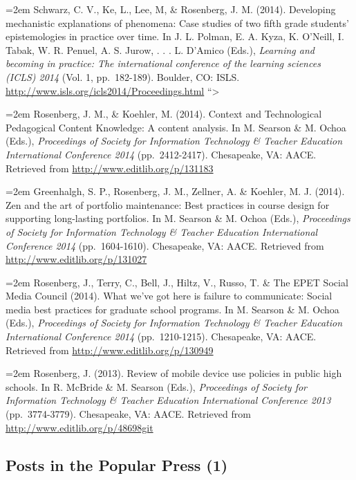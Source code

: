 \documentclass[
  14,
]{article}
\begin{document}
\hangindent=2em Schwarz, C. V., Ke, L., Lee, M, \& Rosenberg, J. M.
(2014). Developing mechanistic explanations of phenomena: Case studies
of two fifth grade students' epistemologies in practice over time. In J.
L. Polman, E. A. Kyza, K. O'Neill, I. Tabak, W. R. Penuel, A. S. Jurow,
. . . L. D'Amico (Eds.), \emph{Learning and becoming in practice: The
international conference of the learning sciences (ICLS) 2014} (Vol. 1,
pp.~182-189). Boulder, CO: ISLS.
\url{http://www.isls.org/icls2014/Proceedings.html} ``\textgreater{}

\hangindent=2em Rosenberg, J. M., \& Koehler, M. (2014). Context and
Technological Pedagogical Content Knowledge: A content analysis. In M.
Searson \& M. Ochoa (Eds.), \emph{Proceedings of Society for Information
Technology \& Teacher Education International Conference 2014}
(pp.~2412-2417). Chesapeake, VA: AACE. Retrieved from
\url{http://www.editlib.org/p/131183}

\hangindent=2em Greenhalgh, S. P., Rosenberg, J. M., Zellner, A. \&
Koehler, M. J. (2014). Zen and the art of portfolio maintenance: Best
practices in course design for supporting long-lasting portfolios. In M.
Searson \& M. Ochoa (Eds.), \emph{Proceedings of Society for Information
Technology \& Teacher Education International Conference 2014}
(pp.~1604-1610). Chesapeake, VA: AACE. Retrieved from
\url{http://www.editlib.org/p/131027}

\hangindent=2em Rosenberg, J., Terry, C., Bell, J., Hiltz, V., Russo, T.
\& The EPET Social Media Council (2014). What we've got here is failure
to communicate: Social media best practices for graduate school
programs. In M. Searson \& M. Ochoa (Eds.), \emph{Proceedings of Society
for Information Technology \& Teacher Education International Conference
2014} (pp.~1210-1215). Chesapeake, VA: AACE. Retrieved from
\url{http://www.editlib.org/p/130949}

\hangindent=2em Rosenberg, J. (2013). Review of mobile device use
policies in public high schools. In R. McBride \& M. Searson (Eds.),
\emph{Proceedings of Society for Information Technology \& Teacher
Education International Conference 2013} (pp.~3774-3779). Chesapeake,
VA: AACE. Retrieved from \url{http://www.editlib.org/p/48698git}

\hypertarget{posts-in-the-popular-press-1}{%
\subsection{Posts in the Popular Press
(1)}\label{posts-in-the-popular-press-1}}
\end{document}

